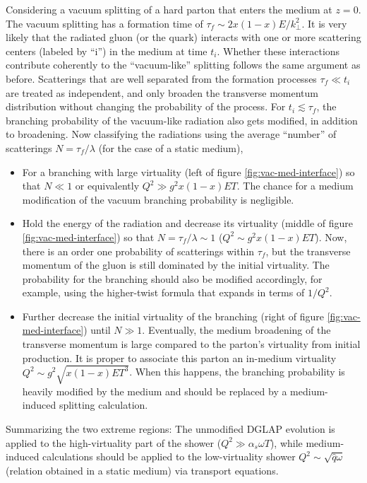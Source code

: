 Considering a vacuum splitting of a hard parton that enters the medium at $z=0$.
The vacuum splitting has a formation time of $\tau_f \sim 2x(1-x)E/k_\perp^2$.
It is very likely that the radiated gluon (or the quark) interacts with one or more scattering centers (labeled by ``i'') in the medium at time $t_i$.
Whether these interactions contribute coherently to the ``vacuum-like'' splitting follows the same argument as before.
Scatterings that are well separated from the formation processes $\tau_f \ll t_i$ are treated as independent, and only broaden the transverse momentum distribution without changing the probability of the process.
For $t_i \lesssim \tau_f$, the branching probability of the vacuum-like radiation also gets modified, in addition to broadening.
Now classifying the radiations using the average ``number'' of scatterings  $N = \tau_f/\lambda$ (for the case of a static medium),
\begin{itemize}
\item For a branching with large virtuality (left of figure \ref{fig:vac-med-interface}) so that $N \ll 1$ or equivalently $Q^2 \gg  g^2 x(1-x)E T$. 
The chance for a medium modification of the vacuum branching probability is negligible. 
\item Hold the energy of the radiation and decrease its virtuality (middle of figure \ref{fig:vac-med-interface}) so that $N = \tau_f/\lambda \sim 1$ ($Q^2 \sim g^2 x(1-x)E T$). 
Now, there is an order one probability of scatterings within $\tau_f$, but the transverse momentum of the gluon is still dominated by the initial virtuality.
The probability for the branching should also be modified accordingly, for example, using the higher-twist formula that expands in terms of $1/Q^2$.
\item Further decrease the initial virtuality of the branching (right of figure \ref{fig:vac-med-interface}) until $N \gg 1$.
Eventually, the medium broadening of the transverse momentum is large compared to the parton's virtuality from initial production.
It is proper to associate this parton an in-medium virtuality $Q^2 \sim g^2\sqrt{x(1-x)E T^3}$. 
When this happens, the branching probability is heavily modified by the medium and should be replaced by a medium-induced splitting calculation.
\end{itemize}
Summarizing the two extreme regions:
The unmodified DGLAP evolution is applied to the high-virtuality part of the shower ($Q^2 \gg \alpha_s \omega T$), while medium-induced calculations should be applied to the low-virtuality shower $Q^2 \sim \sqrt{\hat{q}\omega}$ (relation obtained in a static medium) via transport equations.
